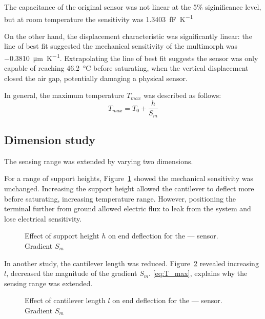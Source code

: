\documentclass[a4paper,10pt,twocolumn]{article}
\begin{document}
The capacitance of the original sensor was not linear at the 5\% siginificance
level, but at room temperature the sensitivity was
\SI{1.3403}{\femto\farad\per\kelvin}

On the other hand, the displacement characteristic was significantly linear:
the line of best fit suggested the mechanical sensitivity of the
multimorph was \SI{-0.3810}{\micro\meter\per\kelvin}. Extrapolating the
line of best fit suggests the sensor was only capable of reaching \SI{46.2}
{\celsius} before saturating, when the vertical displacement closed the air gap,
potentially damaging a physical sensor.

In general, the maximum temperature $T_{max}$ was described as follows:
\begin{equation} \label{eq:T_max}
    T_{max} = T_0 + \frac{h}{S_m}
\end{equation}

\subsection{Dimension study}

The sensing range was extended by varying two dimensions.

For a range of support heights, Figure~\ref{fig:h} showed the mechanical
sensitivity was unchanged. Increasing the support height allowed the cantilever
to deflect more before saturating, increasing temperature range. However,
positioning the terminal further from ground allowed electric flux to leak from
the system and lose electrical sensitivity.

\begin{figure}[h]
    \centering
    \begin{footnotesize}
        
    \end{footnotesize}
    \caption{Effect of support height $h$ on end deflection for the
        ---- sensor. Gradient $S_m$}
    \label{fig:h}
\end{figure}

In another study, the cantilever length was reduced. Figure~\ref{fig:l} revealed
increasing $l$, decreased the magnitude of the gradient $S_m$. \eqref{eq:T_max},
explains why the sensing range was extended.

\begin{figure}[h]
    \centering
    \begin{footnotesize}
        
    \end{footnotesize}
    \caption{Effect of cantilever length $l$ on end deflection for the
        ---- sensor. Gradient $S_m$}
    \label{fig:l}
\end{figure}
\end{document}
